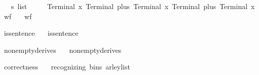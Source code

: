 \begin{isabellebody}
\isamarkupfalse%
\ {\isasymomega}\ {\isacharcolon}{\kern0pt}{\isacharcolon}{\kern0pt}\ {\isachardoublequoteopen}s\ list{\isachardoublequoteclose}\ \isanewline
\ \ {\isachardoublequoteopen}{\isasymomega}\ {\isacharequal}{\kern0pt}\ {\isacharbrackleft}{\kern0pt}Terminal\ x{\isacharcomma}{\kern0pt}\ Terminal\ plus{\isacharcomma}{\kern0pt}\ Terminal\ x{\isacharcomma}{\kern0pt}\ Terminal\ plus{\isacharcomma}{\kern0pt}\ Terminal\ x{\isacharbrackright}{\kern0pt}{\isachardoublequoteclose}\isanewline
\isanewline
{}\isamarkupfalse%
\ wf{\isacharunderscore}{\kern0pt}{\isasymG}{\isacharcolon}{\kern0pt}\isanewline
\ \ \ {\isachardoublequoteopen}wf{\isacharunderscore}{\kern0pt}{\isasymG}\ {\isasymG}{\isachardoublequoteclose}%
\isadelimproof
%
\endisadelimproof
%
\isatagproof
%
\endisatagproof
{\isafoldproof}%
%
\isadelimproof
%
\endisadelimproof
%
\begin{isamarkuptext}%
%
\end{isamarkuptext}\isamarkuptrue%
\isamarkupfalse%
\ is{\isacharunderscore}{\kern0pt}sentence{\isacharunderscore}{\kern0pt}{\isasymomega}{\isacharcolon}{\kern0pt}\isanewline
\ \ \ {\isachardoublequoteopen}is{\isacharunderscore}{\kern0pt}sentence\ {\isasymG}\ {\isasymomega}{\isachardoublequoteclose}%
\isadelimproof
%
\endisadelimproof
%
\isatagproof
%
\endisatagproof
{\isafoldproof}%
%
\isadelimproof
%
\endisadelimproof
%
\begin{isamarkuptext}%
%
\end{isamarkuptext}\isamarkuptrue%
\isamarkupfalse%
\ nonempty{\isacharunderscore}{\kern0pt}derives{\isacharcolon}{\kern0pt}\isanewline
\ \ \ {\isachardoublequoteopen}nonempty{\isacharunderscore}{\kern0pt}derives\ {\isasymG}{\isachardoublequoteclose}%
\isadelimproof
%
\endisadelimproof
%
\isatagproof
%
\endisatagproof
{\isafoldproof}%
%
\isadelimproof
%
\endisadelimproof
%
\begin{isamarkuptext}%
%
\end{isamarkuptext}\isamarkuptrue%
\isamarkupfalse%
\ correctness{\isacharcolon}{\kern0pt}\isanewline
\ \ \ {\isachardoublequoteopen}recognizing\ {\isacharparenleft}{\kern0pt}bins\ {\isacharparenleft}{\kern0pt}{\isasymE}arley{\isacharunderscore}{\kern0pt}list\ {\isasymG}\ {\isasymomega}{\isacharparenright}{\kern0pt}{\isacharparenright}{\kern0pt}\ {\isasymG}\ {\isasymomega}\ {\isasymlongleftrightarrow}\ {\isasymG}\ {\isasymturnstile}\ {\isacharbrackleft}{\kern0pt}{\isasymSS}\ {\isasymG}{\isacharbrackright}{\kern0pt}\ {\isasymRightarrow}\isactrlsup {\isacharasterisk}{\kern0pt}\ {\isasymomega}{\isachardoublequoteclose}%
\isadelimproof
%
\endisadelimproof
%
\isatagproof
%
\endisatagproof
{\isafoldproof}%
%
\isadelimproof
%
\endisadelimproof
%
\isadelimtheory
%
\endisadelimtheory
%
\isatagtheory
%
\endisatagtheory
{\isafoldtheory}%
%
\isadelimtheory
%
\endisadelimtheory
%
\end{isabellebody}%
